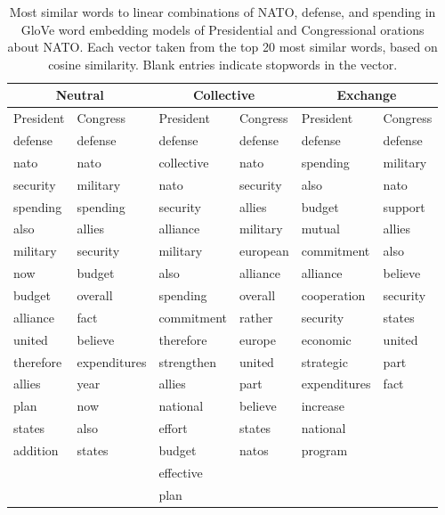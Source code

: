 \documentclass[12pt]{article}
\begin{document}
\begin{table}[htpb]
\centering
\begin{tabular}{llllll}
  \multicolumn{2}{c}{Neutral} & 
                                   \multicolumn{2}{c}{Collective} &
                                   \multicolumn{2}{c}{Exchange}\\ \hline
President & Congress & President & Congress & President & Congress \\ 
  \hline
defense & defense & defense & defense & defense & defense \\ 
  nato & nato & collective & nato & spending & military \\ 
  security & military & nato & security & also & nato \\ 
  spending & spending & security & allies & budget & support \\ 
  also & allies & alliance & military & mutual & allies \\ 
  military & security & military & european & commitment & also \\ 
  now & budget & also & alliance & alliance & believe \\ 
  budget & overall & spending & overall & cooperation & security \\ 
  alliance & fact & commitment & rather & security & states \\ 
  united & believe & therefore & europe & economic & united \\ 
  therefore & expenditures & strengthen & united & strategic & part \\ 
  allies & year & allies & part & expenditures & fact \\ 
  plan & now & national & believe & increase &  \\ 
  states & also & effort & states & national &  \\ 
  addition & states & budget & natos & program &  \\ 
   &  & effective &  &  &  \\ 
   &  & plan &  &  &  \\ 
   \hline
\end{tabular}
\caption{Most similar words to linear combinations of NATO, defense, and spending
                     in GloVe word embedding models of Presidential and Congressional orations about NATO.                     
         Each vector taken from the top 20 most similar words, based on cosine similarity.             
        Blank entries indicate stopwords in the vector.} 
\label{tab:glove-vectors}
\end{table}
\end{document}
